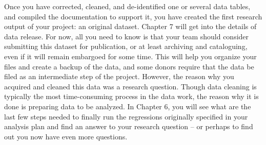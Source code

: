 Once you have corrected, cleaned, and de-identified one or several data tables,
and compiled the documentation to support it,
you have created the first research output of your project: an original dataset.
Chapter 7 will get into the details of data release.
For now, all you need to know is that your team
should consider submitting this dataset for publication,
or at least archiving and cataloguing,
even if it will remain embargoed for some time.
This will help you organize your files and create a backup of the data,
and some donors require that the data be filed as an intermediate step of the project.
However, the reason why you acquired and cleaned this data
was a research question.
Though data cleaning is typically the most time-consuming process in the data work,
the reason why it is done is preparing data to be analyzed.
In Chapter 6, you will see what are the last few steps needed to finally run the
regressions originally specified in your analysis plan
and find an answer to your research question --
or perhaps to find out you now have even more questions.

